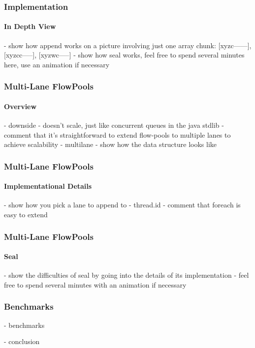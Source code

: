 \documentclass{beamer}
\begin{document}
\begin{frame}
  \frametitle{Implementation}
  \framesubtitle{In Depth View}

- show how append works on a picture involving just one array chunk:        [xyzc------], [xyzcc-----], [xyzwc-----]   
- show how seal works, feel free to spend several minutes here, use an animation if necessary


\end{frame}

\begin{frame}
  \frametitle{Multi-Lane FlowPools}
  \framesubtitle{Overview}

- downside - doesn't scale, just like concurrent queues in the java stdlib
- comment that it's straightforward to extend flow-pools to multiple lanes to achieve scalability
- multilane - show how the data structure looks like

\end{frame}

\begin{frame}
  \frametitle{Multi-Lane FlowPools}
  \framesubtitle{Implementational Details}

- show how you pick a lane to append to - thread.id
- comment that foreach is easy to extend

\end{frame}

\begin{frame}
  \frametitle{Multi-Lane FlowPools}
  \framesubtitle{Seal}

- show the difficulties of seal by going into the details of its implementation - feel free to spend several minutes with an animation if necessary

\end{frame}

\begin{frame}
  \frametitle{Benchmarks}

- benchmarks
\end{frame}

\begin{frame}
- conclusion
\end{frame}
\end{document}
